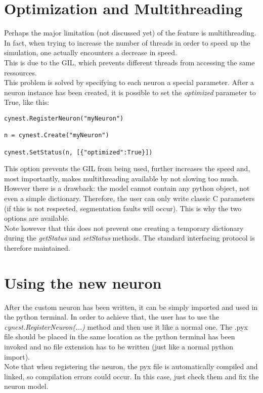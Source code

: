 \documentclass{article}
\begin{document}
\section{Optimization and Multithreading}
Perhaps the major limitation (not discussed yet) of the feature is multithreading. In fact, when trying to increase the number of threads in order to speed up the simulation, one actually encounters a decrease in speed.\\
This is due to the GIL, which prevents different threads from accessing the same ressources.\\
This problem is solved by specifying to each neuron a special parameter. After a neuron instance has been created, it is possible to set the \emph{optimized} parameter to True, like this:
\begin{verbatim}
cynest.RegisterNeuron("myNeuron")

n = cynest.Create("myNeuron")

cynest.SetStatus(n, [{"optimized":True}])
\end{verbatim}
This option prevents the GIL from being used, further increases the speed and, most importantly, makes multithreading available by not slowing too much.\\
However there is a drawback: the model cannot contain any python object, not even a simple dictionary. Therefore, the user can only write classic C parameters (if this is not respected, segmentation faults will occur). This is why the two options are available. \\
Note however that this does not prevent one creating a temporary dictionary during the \emph{getStatus} and \emph{setStatus} methods. The standard interfacing protocol is therefore maintained.


\section{Using the new neuron}
After the custom neuron has been written, it can be simply imported and used in the python terminal. In order to achieve that, the user has to use the \emph{cynest.RegisterNeuron(...)} method and then use it like a normal one. The .pyx file should be placed in the same location as the python terminal has been invoked and no file extension has to be written (just like a normal python import).\\
Note that when registering the neuron, the pyx file is automatically compiled and linked, so compilation errors could occur. In this case, just check them and fix the neuron model.
\end{document}

